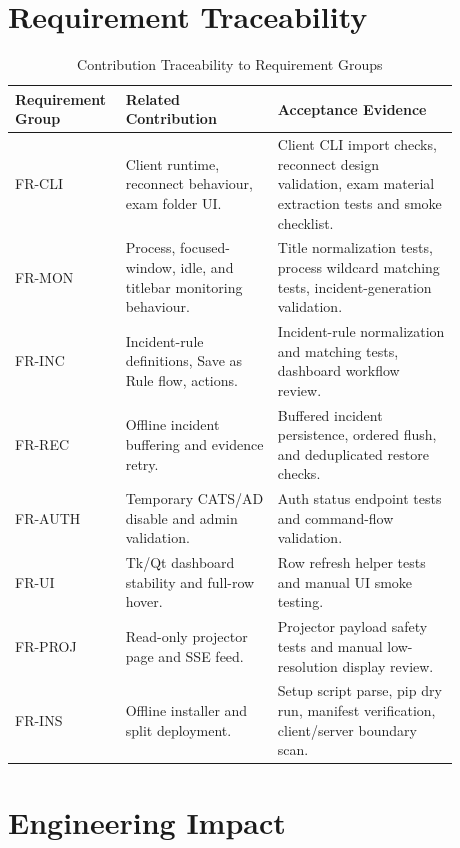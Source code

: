 \documentclass[conference]{IEEEtran}
\begin{document}
\section{Requirement Traceability}

\begin{table}[htbp]
\caption{Contribution Traceability to Requirement Groups}
\centering
\begin{tabular}{P{0.18\linewidth} P{0.32\linewidth} P{0.38\linewidth}}
\toprule
\textbf{Requirement Group} & \textbf{Related Contribution} & \textbf{Acceptance Evidence} \\
\midrule
FR-CLI & Client runtime, reconnect behaviour, exam folder UI. & Client CLI import checks, reconnect design validation, exam material extraction tests and smoke checklist. \\
\midrule
FR-MON & Process, focused-window, idle, and titlebar monitoring behaviour. & Title normalization tests, process wildcard matching tests, incident-generation validation. \\
\midrule
FR-INC & Incident-rule definitions, Save as Rule flow, actions. & Incident-rule normalization and matching tests, dashboard workflow review. \\
\midrule
FR-REC & Offline incident buffering and evidence retry. & Buffered incident persistence, ordered flush, and deduplicated restore checks. \\
\midrule
FR-AUTH & Temporary CATS/AD disable and admin validation. & Auth status endpoint tests and command-flow validation. \\
\midrule
FR-UI & Tk/Qt dashboard stability and full-row hover. & Row refresh helper tests and manual UI smoke testing. \\
\midrule
FR-PROJ & Read-only projector page and SSE feed. & Projector payload safety tests and manual low-resolution display review. \\
\midrule
FR-INS & Offline installer and split deployment. & Setup script parse, pip dry run, manifest verification, client/server boundary scan. \\
\bottomrule
\end{tabular}
\label{tab:traceability}
\end{table}

\section{Engineering Impact}
\end{document}
